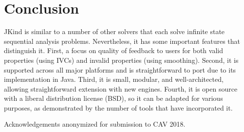 \documentclass{llncs}
\newcommand{\jkind}{{\sc JKind}\xspace}
\newcommand{\lustre}{{\sc Lustre}\xspace}
\renewcommand{\paragraph}[1]{\vspace{5pt}\noindent {\bf #1}}
\begin{document}

\section{Conclusion}
\jkind is similar to a number of other solvers that each solve
infinite state sequential analysis problems. Nevertheless, it has some
important features that distinguish it. First, a focus on quality of
feedback to users for both valid properties (using IVCs) and invalid
properties (using smoothing). Second, it is supported across all major platforms and is
straightforward to port due to its implementation in Java. Third, it
is small, modular, and well-architected, allowing straightforward
extension with new engines. Fourth, it is open source with a liberal
distribution license (BSD), so it can be adapted for various purposes,
as demonstrated by the number of tools that have incorporated it.



\paragraph{Acknowledgments}

Acknowledgements anonymized for submission to CAV 2018.


{}

\end{document}

